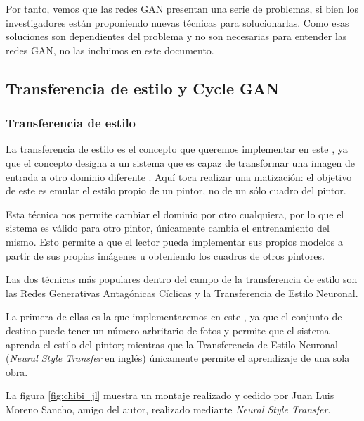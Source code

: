 \documentclass[../main.tex]{subfiles}
\begin{document}
Por tanto, vemos que las redes GAN presentan una serie de problemas, si bien los investigadores están proponiendo nuevas técnicas para solucionarlas. Como esas soluciones son dependientes del problema y no son necesarias para entender las redes GAN, no las incluimos en este documento.


\subsection{Transferencia de estilo y Cycle GAN}
\subsubsection{Transferencia de estilo}

La transferencia de estilo es el concepto que queremos implementar en este \tfg, ya que el concepto designa a un sistema que es capaz de transformar una imagen de entrada a otro dominio diferente \cite{Foster2019}. Aquí toca realizar una matización: el objetivo de este \tfg es emular el estilo propio de un pintor, no de un sólo cuadro del pintor. \newline

Esta técnica nos permite cambiar el dominio por otro cualquiera, por lo que el sistema es válido para otro pintor, únicamente cambia el entrenamiento del mismo. Esto permite a que el lector pueda implementar sus propios modelos a partir de sus propias imágenes u obteniendo los cuadros de otros pintores. \newline

Las dos técnicas más populares dentro del campo de la transferencia de estilo son las Redes Generativas Antagónicas Cíclicas y la Transferencia de Estilo Neuronal. \newline

La primera de ellas es la que implementaremos en este \tfg, ya que el conjunto de destino puede tener un número arbritario de fotos y permite que el sistema aprenda el estilo del pintor; mientras que la Transferencia de Estilo Neuronal (\textit{Neural Style Transfer} en inglés) únicamente permite el aprendizaje de una sola obra.  \newline

La figura \ref{fig:chibi_jl} muestra un montaje realizado y cedido por Juan Luis Moreno Sancho, amigo del autor, realizado mediante \textit{Neural Style Transfer}. \newline
\end{document}
